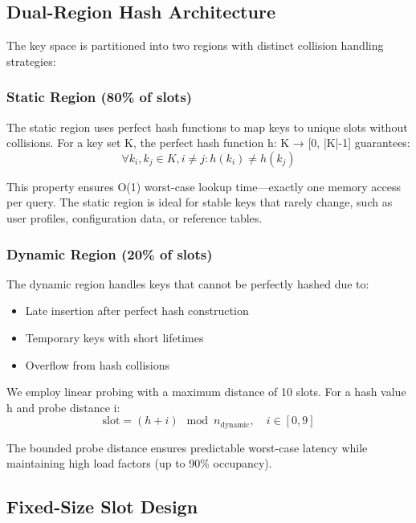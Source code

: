\documentclass[10pt,conference]{IEEEtran}
\begin{document}
\subsection{Dual-Region Hash Architecture}

The key space is partitioned into two regions with distinct collision handling strategies:

\subsubsection{Static Region (80\% of slots)}
The static region uses perfect hash functions to map keys to unique slots without collisions. For a key set K, the perfect hash function h: K → [0, |K|-1] guarantees:
\begin{equation}
\forall k_i, k_j \in K, i \neq j : h(k_i) \neq h(k_j)
\end{equation}

This property ensures O(1) worst-case lookup time—exactly one memory access per query. The static region is ideal for stable keys that rarely change, such as user profiles, configuration data, or reference tables.

\subsubsection{Dynamic Region (20\% of slots)}
The dynamic region handles keys that cannot be perfectly hashed due to:
\begin{itemize}
\item Late insertion after perfect hash construction
\item Temporary keys with short lifetimes
\item Overflow from hash collisions
\end{itemize}

We employ linear probing with a maximum distance of 10 slots. For a hash value h and probe distance i:
\begin{equation}
\text{slot} = (h + i) \mod n_{\text{dynamic}}, \quad i \in [0, 9]
\end{equation}

The bounded probe distance ensures predictable worst-case latency while maintaining high load factors (up to 90\% occupancy).

\subsection{Fixed-Size Slot Design}
\end{document}
